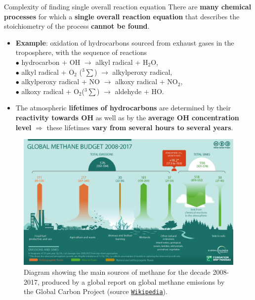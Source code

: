 \begin{frame}[<+->]{Complexity of finding single overall reaction equation}
	\small
	There are {\bf many chemical processes} for which a {\bf single overall reaction equation}
	that describes the stoichiometry of the process \alert{{\bf cannot be found}}.
	\lcol
		\begin{itemize}
		\item {\bf Example}: \alert{oxidation of hydrocarbons sourced from exhaust gases in the troposphere}, 
		with the sequence of reactions \\[5pt]
		{
			\scriptsize
			$\bullet$ hydrocarbon + OH $\rightarrow$ alkyl radical + H$_2$O, \\[3pt]
			$\bullet$ alkyl radical + O$_2$ ($^3\sum$) $\rightarrow$ alkylperoxy radical, \\[3pt]
			$\bullet$ alkylperoxy radical + NO $\rightarrow$ alkoxy radical + NO$_2$, \\[3pt]
			$\bullet$ alkoxy radical + O$_2$($^3\sum$) $\rightarrow$ aldehyde + HO. \\[10pt]
		}
		\item The atmospheric {\bf lifetimes of hydrocarbons} are determined by their {\bf reactivity towards OH} as well as by the {\bf average OH concentration level} $\Rightarrow$ these lifetimes {\bf vary from several hours to several years}.
		\end{itemize}

	
	\rcol
	
	\begin{figure}
		\vskip 5pt
		\centering
		\includegraphics[height=0.5\columnwidth]{figures/chemical-kinetics/methane-sources.png}
		\caption{Diagram showing the main sources of methane for the decade 2008-2017, 
			produced by a global report on global methane emissions by the Global Carbon Project 
			(source \href{https://en.wikipedia.org/wiki/Atmospheric_methane}{\textcolor{indigo(dye)}{\tt Wikipedia}}).}
	\end{figure}
	
	\ecol
\end{frame}

